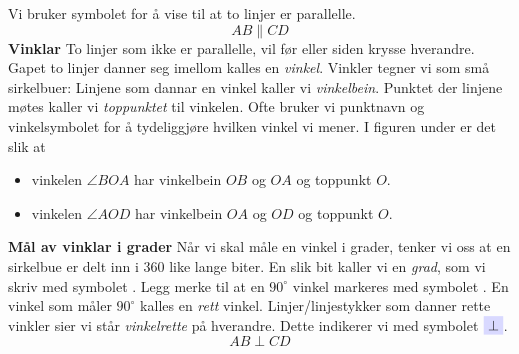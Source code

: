 Vi bruker symbolet \sym{$ \parallel $} for å vise til at to linjer er parallelle.
\[ AB\parallel CD \]
\textbf{Vinklar} \label{vinklar}\os
To linjer som ikke er parallelle, vil før eller siden krysse hverandre. Gapet to linjer danner seg imellom kalles en \textit{vinkel}. Vinkler tegner vi som små sirkelbuer:
Linjene som dannar en vinkel kaller vi \textit{vinkelbein}. Punktet der linjene møtes kaller vi \textit{toppunktet} til vinkelen. Ofte bruker vi punktnavn og vinkelsymbolet \sym{$ \angle $} for å tydeliggjøre hvilken vinkel vi mener. I figuren under er det slik at
\begin{itemize}
\item vinkelen $ \angle BOA $  har vinkelbein $ OB $ og $ OA $ og toppunkt $ O $.
\item vinkelen $ \angle AOD $  har vinkelbein $ OA $ og $ OD $ og toppunkt $ O $.	
\end{itemize}
\newpage
\textbf{Mål av vinklar i grader}\os
Når vi skal måle en vinkel i grader, tenker vi oss at en sirkelbue er delt inn i 360 like lange biter. En slik bit kaller vi en \textit{grad}, som vi skriv med symbolet \sym{$ ^\circ $}. 
 \vsk
Legg merke til at en $ 90^\circ $ vinkel markeres med symbolet \sym{$ \square $}. En vinkel som måler $ 90^\circ $ kalles en \textit{rett }vinkel. Linjer/linjestykker som danner rette vinkler sier vi står \textit{vinkelrette} på hverandre. Dette indikerer vi med symbolet $ \sym{$ \perp $} $.
\[ AB\perp CD \]
\newpage
{}\vsk
\label{vinkelend}
\newpage
{}

